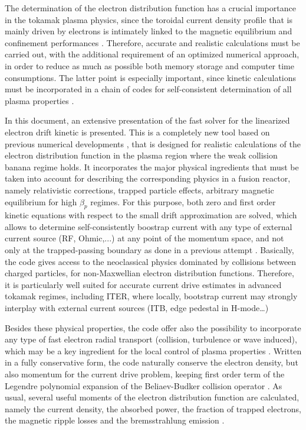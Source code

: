
The determination of the electron distribution function has a crucial
importance in the tokamak plasma physics, since the toroidal current density
profile that is mainly driven by electrons is intimately linked to the
magnetic equilibrium and confinement performances \cite{pey03}. Therefore,
accurate and realistic calculations must be carried out, with the additional
requirement of an optimized numerical approach, in order to reduce as much
as possible both memory storage and computer time consumptions. The latter
point is especially important, since kinetic calculations must be incorporated in a
chain of codes for self-consistent determination of all plasma properties
\cite{bas03}.

In this document, an extensive presentation of the fast solver for the
linearized electron drift kinetic is presented. This is a completely new
tool based on previous numerical developments \cite{sch99}, that is designed
for realistic calculations of the electron distribution function in the
plasma region where the weak collision banana regime holds. It incorporates
the major physical ingredients that must be taken into account for
describing the corresponding physics in a fusion reactor, namely
relativistic corrections, trapped particle effects, arbitrary magnetic
equilibrium for high $\beta _{p}$ regimes. For this purpose, both zero and
first order kinetic equations with respect to the small drift approximation
are solved, which allows to determine self-consistently boostrap current
with any type of external current source (RF, Ohmic,...) at any point of the
momentum space, and not only at the trapped-passing boundary as done
in a previous attempt \cite{wes96}. Basically, the
code gives access to the neoclassical physics dominated by collisions
between charged particles, for non-Maxwellian electron distribution
functions. Therefore, it is particularly well suited for accurate current
drive estimates in advanced tokamak regimes, including ITER, where locally,
bootstrap current may strongly interplay with external current sources
(ITB, edge pedestal in H-mode\ldots)

Besides these physical properties, the code offer also the possibility to
incorporate any type of fast electron radial transport (collision,
turbulence or wave induced), which may be a key ingredient for the local
control of plasma properties \cite{pey93}. Written in a fully conservative
form, the code naturally conserve the electron density, but also momentum
for the current drive problem, keeping first order term of the Legendre
polynomial expansion of the Beliaev-Budker collision operator \cite{bra89}.
As usual, several useful moments of the electron distribution function are
calculated, namely the current density, the absorbed power, the fraction of
trapped electrons, the magnetic ripple losses \cite{ju02} and the
bremsstrahlung emission \cite{pey99}.

